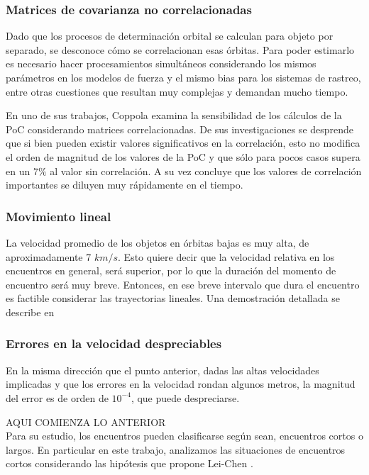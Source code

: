 \subsubsection*{Matrices de covarianza no correlacionadas}
Dado que los procesos de determinaci\'on orbital se calculan para objeto por separado, se desconoce c\'omo se correlacionan esas \'orbitas. Para poder estimarlo es necesario hacer procesamientos simult\'aneos considerando los mismos par\'ametros en los modelos de fuerza y el mismo bias para los sistemas de rastreo, entre otras cuestiones que resultan muy complejas y demandan mucho tiempo.

En uno de sus trabajos, Coppola \citep{coppola2004effects} examina la sensibilidad de los c\'alculos de la PoC considerando matrices correlacionadas. De sus investigaciones se desprende que si bien pueden existir valores significativos en la correlaci\'on, esto no modifica el orden de magnitud de los valores de la PoC y que s\'olo para pocos casos supera en un 7$\%$ al valor sin correlaci\'on. A su vez concluye que los valores de correlaci\'on importantes se diluyen muy r\'apidamente en el tiempo.

\subsubsection*{Movimiento lineal}
La velocidad promedio de los objetos en \'orbitas bajas es muy alta, de aproximadamente 7 $km/s$. Esto quiere decir que la velocidad relativa en los encuentros en general, ser\'a superior, por lo que la duraci\'on del momento de encuentro ser\'a muy breve. Entonces, en ese breve intervalo que dura el encuentro es factible considerar las trayectorias lineales. Una demostraci\'on detallada se describe en \citep{arrufat2013study}

\subsubsection*{Errores en la velocidad despreciables}
En la misma direcci\'on que el punto anterior, dadas las altas velocidades implicadas y que los errores en la velocidad rondan algunos metros, la magnitud del error es de orden de $10^{-4}$, que puede despreciarse. 



AQUI COMIENZA LO ANTERIOR\\

Para su estudio, los encuentros pueden clasificarse seg\'un sean, encuentros cortos o largos. En particular en este trabajo, analizamos las situaciones de encuentros cortos considerando las hip\'otesis que propone Lei-Chen \citep{leichen}.\\

